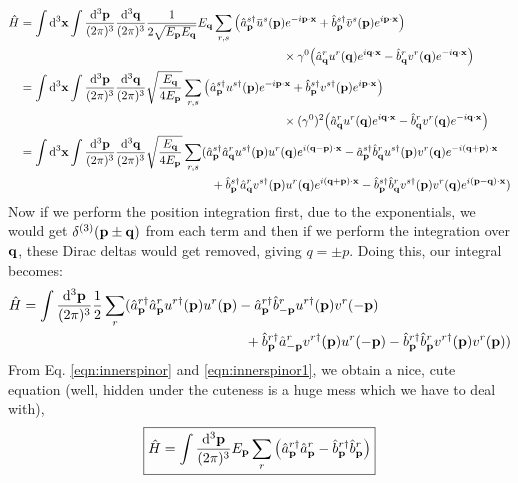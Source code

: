 \begin{align*}
   \hat{H} &=\int \dd^3 \vb{x}\int \meas{\vb{p}} \meas{\vb{q}} \frac{1}{2\sqrt{E_{\vb{p}}E_{\vb{q}}}}E_{\vb{q}} \sum \limits_{r,s} \qty(\creap \dadj{u}^s(\vb{p}) e^{-i \pdx} +\crebp \dadj{v}^s(\vb{p}) e^{i \pdx})\\ &\qquad\qquad\qquad\qquad\qquad\qquad\qquad\qquad\qquad\qquad\qquad\times \gamma^0  \qty(\annaqr u^r(\vb{q}) e^{i \qdx} -\annbqr  v^r(\vb{q}) e^{-i \qdx})\\
&=\int \dd^3 \vb{x}\int \meas{\vb{p}} \meas{\vb{q}} \sqrt{\frac{E_{\vb{q}}}{4{E_{\vb{p}}}}} \sum \limits_{r,s} \qty(\creap {u}^{s\dagger}(\vb{p}) e^{-i \pdx} +\crebp {v}^{s\dagger}(\vb{p}) e^{i \pdx})\\ &\qquad\qquad\qquad\qquad\qquad\qquad\qquad\qquad\qquad\qquad\qquad\times( \gamma^0)^2  \qty(\annaqr u^r(\vb{q}) e^{i \qdx} -\annbqr  v^r(\vb{q}) e^{-i \qdx})\\
&=\int \dd^3 \vb{x}\int \meas{\vb{p}} \meas{\vb{q}}\sqrt{\frac{E_{\vb{q}}}{4{E_{\vb{p}}}}} \sum \limits_{r,s}(\creap\annaqr {u}^{s\dagger}(\vb{p})u^r(\vb{q}) e^{i(\vb{q}-\vb{p})\cdot \vb{x}}-\creap\annbqr{u}^{s\dagger}(\vb{p})v^r(\vb{q})  e^{-i(\vb{q}+\vb{p})\cdot \vb{x}}\\ &\qquad\qquad\qquad\qquad\qquad\qquad\qquad\qquad+\crebp\annaqr{v}^{s\dagger}(\vb{p})u^r(\vb{q}) e^{i(\vb{q}+\vb{p})\cdot \vb{x}} -\crebp\annbqr{v}^{s\dagger}(\vb{p})v^r(\vb{q})e^{i(\vb{p}-\vb{q})\cdot \vb{x}})
\end{align*}
Now if we perform the position integration first, due to the exponentials, we would get $\delta^{(3)}{(\vb{p}\pm \vb{q})}$ from each term and then if we perform the integration over $\vb{q}$, these Dirac deltas would get removed, giving $q=\pm p$. Doing this, our integral becomes:
\begin{align*}
   \hat{H} &=\int \frac{\dd^3\vb{{\vb{p}}}}{(2\pi)^3} \frac{1}{2} \sum \limits_{r}({\hat{a}_{\vb{p}}}^{r\dagger}{\hat{a}_{\vb{p}}}^{r} {u}^{r\dagger}(\vb{p})u^r(\vb{p})-{\hat{a}_{\vb{p}}}^{r\dagger}{\hat{b}_{-\vb{p}}}^{r}{u}^{r\dagger}(\vb{p})v^r(-\vb{p}) \\ &\qquad\qquad\qquad\qquad\qquad\qquad\qquad\qquad+{\hat{b}_{\vb{p}}}^{r\dagger}{\hat{a}_{-\vb{p}}}^{r}{v}^{r\dagger}(\vb{p})u^r(-\vb{p}) -{\hat{b}_{\vb{p}}}^{r\dagger}{\hat{b}_{\vb{p}}}^{r}{v}^{r\dagger}(\vb{p})v^r(\vb{p}))
\end{align*}
From Eq. \ref{eqn:innerspinor} and \ref{eqn:innerspinor1}, we obtain a nice, cute equation (well, hidden under the cuteness is a huge mess which we have to deal with),
\begin{align}\label{eqn:hamiltonian}
  \boxed{ \hat{H} = \int \frac{\dd^3\vb{{\vb{p}}}}{(2\pi)^3} E_{\vb{p}} \sum \limits_{r}\qty({\hat{a}_{\vb{p}}}^{r\dagger}{\hat{a}_{\vb{p}}}^{r} -{\hat{b}_{\vb{p}}}^{r\dagger}{\hat{b}_{\vb{p}}}^{r})}
\end{align}
